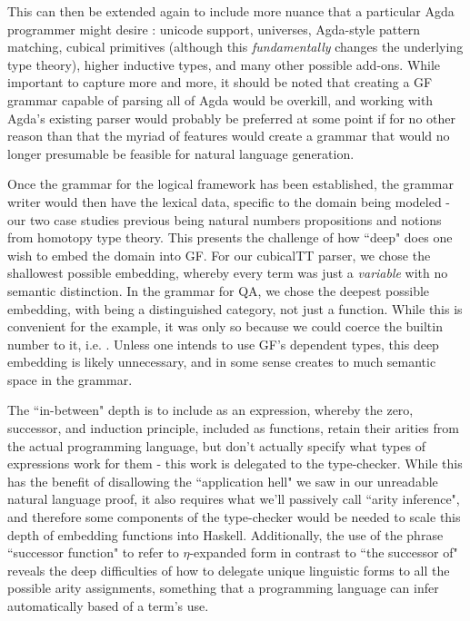 This can then be extended again to include more nuance that a particular Agda programmer
might desire : unicode support, universes, Agda-style pattern matching, cubical
primitives (although this \emph{fundamentally} changes the underlying type
theory), higher inductive types, and many other possible add-ons. While
important to capture more and more, it should be noted that creating a GF
grammar capable of parsing all of Agda would be overkill, and working with
Agda's existing parser would probably be preferred at some point if for no other
reason than that the myriad of features would create a grammar that would no
longer presumable be feasible for natural language generation.

Once the grammar for the logical framework has been established, the grammar
writer would then have the lexical data, specific to the domain being modeled -
our two case studies previous being natural numbers propositions and
notions from homotopy type theory.  This presents the challenge of how ``deep"
does one wish to embed the domain into GF. For our cubicalTT parser, we chose
the shallowest possible embedding, whereby every term was just a \emph{variable}
with no semantic distinction. In the grammar for QA, we chose the deepest
possible embedding, with  being a distinguished category, not just
a function. While this is convenient for the example, it was only so because
we could coerce the builtin number to it, i.e. . Unless one
intends to use GF's dependent types, this deep embedding is likely unnecessary,
and in some sense creates to much semantic space in the grammar.

The ``in-between" depth is to include  as an expression, whereby the
zero, successor, and induction principle, included as functions, retain their
arities from the actual programming language, but don't actually specify what
types of expressions work for them - this work is delegated to the type-checker.
While this has the benefit of disallowing the ``application hell" we saw in our
unreadable natural language proof, it also requires what we'll passively call
``arity inference", and therefore some components of the type-checker would be
needed to scale this depth of embedding functions into Haskell. Additionally,
the use of the phrase ``successor function" to refer to $\eta$-expanded form in
contrast to ``the successor of" reveals the deep difficulties of how to delegate
unique linguistic forms to all the possible arity assignments, something that a
programming language can infer automatically based of a term's use.

